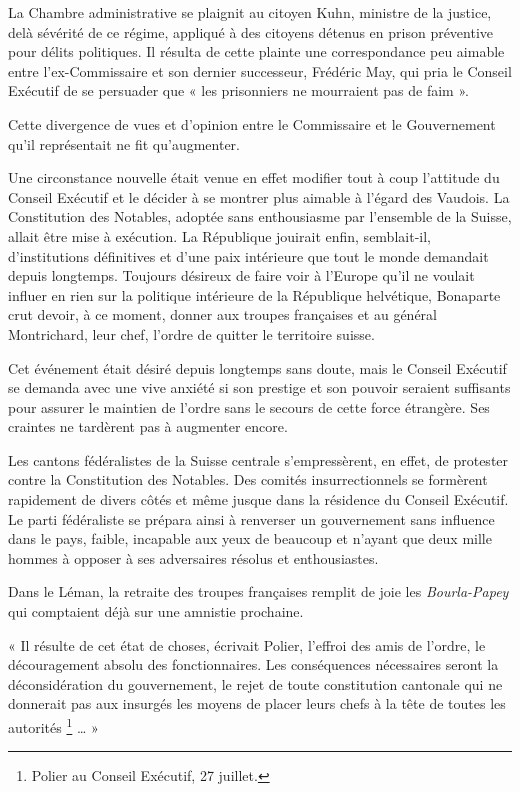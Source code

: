 \documentclass[french,twoside]{book} %
\newenvironment{quoteblock}%
  {\begin{quoting}}
  {\end{quoting}}
\newenvironment{quotebar}{%
    \def\FrameCommand{{\color{rubric!10!}\vrule width 0.5em} \hspace{0.9em}}%
    \def\OuterFrameSep{\itemsep} %
    \MakeFramed {\advance\hsize-\width \FrameRestore}
  }%
  {%
    \endMakeFramed
  }
\renewenvironment{quoteblock}%
  {%
    \savenotes
    \setstretch{0.9}
    \begin{quotebar}
  }
  {%
    \end{quotebar}
    \spewnotes
  }
\begin{document}
La Chambre administrative se plaignit au citoyen Kuhn, ministre de la justice, delà sévérité de ce régime, appliqué à des citoyens détenus en prison préventive pour délits politiques. Il résulta de cette plainte une correspondance peu aimable entre l’ex-Commissaire et son dernier successeur, Frédéric May, qui pria le Conseil Exécutif de se persuader que « les prisonniers ne mourraient pas de faim ».\par
Cette divergence de vues et d’opinion entre le Commissaire et le Gouvernement qu’il représentait ne fit qu’augmenter.\par
Une circonstance nouvelle était venue en effet modifier tout à coup l’attitude du Conseil Exécutif et le décider à se montrer plus aimable à l’égard des Vaudois. La Constitution des Notables, adoptée sans enthousiasme par l’ensemble de la Suisse, allait être mise à exécution. La République jouirait enfin, semblait-il, d’institutions définitives et d’une paix intérieure que tout le monde demandait depuis longtemps. Toujours désireux de faire voir à l’Europe qu’il ne voulait influer en rien sur la politique intérieure de la République helvétique, Bonaparte crut devoir, à ce moment, donner aux troupes françaises et au général Montrichard, leur chef, l’ordre de quitter le territoire suisse.\par
Cet événement était désiré depuis longtemps sans doute, mais le Conseil Exécutif se demanda avec une vive anxiété si son prestige et son pouvoir seraient suffisants pour assurer le maintien de l’ordre sans le secours de cette force étrangère. Ses craintes ne tardèrent pas à augmenter encore.\par
Les cantons fédéralistes de la Suisse centrale s’empressèrent, en effet, de protester contre la Constitution des Notables. Des comités insurrectionnels se formèrent rapidement de divers côtés et même jusque dans la résidence du Conseil Exécutif. Le parti fédéraliste se prépara ainsi à renverser un gouvernement sans influence dans le pays, faible, incapable aux yeux de beaucoup et n’ayant que deux mille hommes à opposer à ses adversaires résolus et enthousiastes.\par
Dans le Léman, la retraite des troupes françaises remplit de joie les \emph{Bourla-Papey} qui comptaient déjà sur une amnistie prochaine.\par

\begin{quoteblock}
\noindent « Il résulte de cet état de choses, écrivait Polier, l’effroi des amis de l’ordre, le découragement absolu des fonctionnaires. Les conséquences nécessaires seront la déconsidération du gouvernement, le rejet de toute constitution cantonale qui ne donnerait pas aux insurgés les moyens de placer leurs chefs à la tête de toutes les autorités \footnote{Polier au Conseil Exécutif, 27 juillet.} … »\end{quoteblock}
\end{document}
